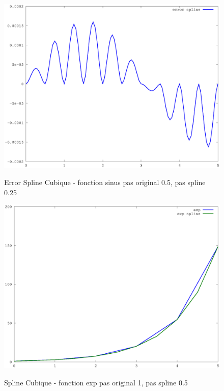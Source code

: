 \documentclass[a4paper,11pt]{article}
\begin{document}
\begin{figure}[h!]
  \begin{centering}
    \includegraphics[scale=0.5]{../sinus_10_error}
    \label{rspro2}
    \par\end{centering}
  \caption{Error Spline Cubique - fonction sinus pas original 0.5, pas spline 0.25}
  \label{fig:jacobi-conv}
\end{figure}

\begin{figure}[h!]
  \begin{centering}
    \includegraphics[scale=0.5]{../exp_2}
    \label{rspro2}
    \par\end{centering}
  \caption{Spline Cubique - fonction exp pas original 1, pas spline 0.5}
  \label{fig:jacobi-conv}
\end{figure}
\end{document}
